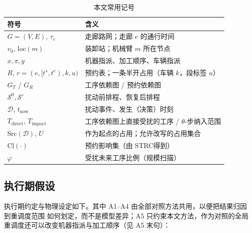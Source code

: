 \documentclass[manuscript,screen,review]{acmart}
\providecommand{\STRC}{\textsc{STRC}}
\begin{document}
\begin{table}[t]
\centering
\caption{本文常用记号}
\label{tab:notation}
\small
\begin{tabular}{@{}ll@{}}
\toprule
\textbf{符号} & \textbf{含义} \\
\midrule
\(G=(V,E)\), \(\tau_e\) & 走廊路网；走廊 \(e\) 的通行时间 \\
\(v_0\), \(\mathrm{loc}(m)\) & 装卸站；机械臂 \(m\) 所在节点 \\
\(x,\pi,y\) & 机器指派、加工顺序、车辆指派 \\
\(R\), \(r=(e,[t^s,t^e),k,u)\) & 预约表；一条半开占用（车辆 \(k\)，段标签 \(u\)）\\
\(G_T\) / \(G_R\) & 工序依赖图 / 预约依赖图 \\
\(\mathcal{S}^0,\mathcal{S}'\) & 扰动前排程、恢复后排程 \\
\(\mathcal{D},\,t_{\mathrm{now}}\) & 扰动事件、发生（决策）时刻 \\
\(T_{\mathrm{direct}},\,T_{\mathrm{impact}}\) & 工序依赖图上直接受扰的工序 / \(\theta\)-步纳入范围 \\
\(\mathrm{Src}(\mathcal{D})\), \(U\) & 作为起点的占用；允许改写的占用集合 \\
\(\mathrm{Cl}(\cdot)\) & 预约影响集（由 \STRC 得到）\\
\(\varphi\) & 受扰未来工序比例（规模扫描）\\
\bottomrule
\end{tabular}
\end{table}

\subsection{执行期假设}
\label{sec:assumptions}

执行期约定与物理设定如下。其中 A1--A4 由全部对照方法共用，以便把结果归因到重调度范围
如何划定，而不是模型差异；A5 只约束本文方法，作为对照的全局重调度还可以改变机器指派与加工顺序（见 A5 末句）：
\end{document}
